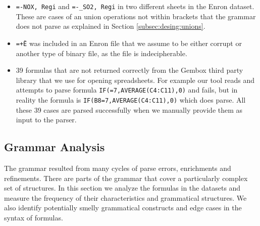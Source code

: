 \documentclass[conference]{IEEEtran}
\begin{document}
\begin{itemize}
	\item \texttt{=-NOX, Regi} and \texttt{=-_SO2, Regi} in two different sheets in the Enron dataset. These are cases of an union operations not within brackets that the grammar does not parse as explained in Section \ref{subsec:desing:unions}.
	\item \texttt{=+Ë\textperthousand} was included in an Enron file that we assume to be either corrupt or another type of binary file, as the file is indecipherable.
	\item 39 formulas that are not returned correctly from the Gembox third party library that we use for opening spreadsheets. For example our tool reads and attempts to parse formula \texttt{IF(=7,AVERAGE(C4:C11),0)} and fails, but in reality the formula is \texttt{IF(B8=7,AVERAGE(C4:C11),0)} which does parse. All these 39 cases are parsed successfully when we manually provide them as input to the parser.
\end{itemize}

\subsection{Grammar Analysis}
The grammar resulted from many cycles of parse errors, enrichments and refinements. There are parts of the grammar that cover a particularly complex set of structures. In this section we analyze the formulas in the datasets and measure the frequency of their characteristics and grammatical structures. We also identify potentially smelly grammatical constructs and edge cases in the syntax of formulas.
\end{document}
